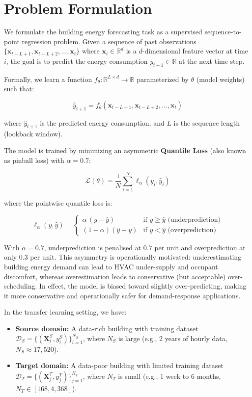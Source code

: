 \documentclass[12pt,a4paper]{report}
\newcommand{\R}{\mathbb{R}}
\begin{document}
\section{Problem Formulation}

We formulate the building energy forecasting task as a supervised sequence-to-point regression problem. Given a sequence of past observations \(\{\mathbf{x}_{t-L+1}, \mathbf{x}_{t-L+2}, \ldots, \mathbf{x}_t\}\) where \(\mathbf{x}_i \in \R^d\) is a \(d\)-dimensional feature vector at time \(i\), the goal is to predict the energy consumption \(y_{t+1} \in \R\) at the next time step.

Formally, we learn a function \(f_{\theta}: \R^{L \times d} \to \R\) parameterized by \(\theta\) (model weights) such that:

\[
\hat{y}_{t+1} = f_{\theta}(\mathbf{x}_{t-L+1}, \mathbf{x}_{t-L+2}, \ldots, \mathbf{x}_t)
\]

where \(\hat{y}_{t+1}\) is the predicted energy consumption, and \(L\) is the sequence length (lookback window).

The model is trained by minimizing an asymmetric \textbf{Quantile Loss} (also known as pinball loss) with \(\alpha = 0.7\):

\[
\mathcal{L}(\theta) = \frac{1}{N} \sum_{i=1}^{N} \ell_\alpha(y_i, \hat{y}_i)
\]

where the pointwise quantile loss is:

\[
\ell_\alpha(y, \hat{y}) =
\begin{cases}
\alpha \,(y - \hat{y}) & \text{if } y \geq \hat{y} \text{ (underprediction)} \\
(1 - \alpha)(\hat{y} - y) & \text{if } y < \hat{y} \text{ (overprediction)}
\end{cases}
\]

With \(\alpha = 0.7\), underprediction is penalised at \(0.7\) per unit and overprediction at only \(0.3\) per unit. This asymmetry is operationally motivated: underestimating building energy demand can lead to HVAC under-supply and occupant discomfort, whereas overestimation leads to conservative (but acceptable) over-scheduling. In effect, the model is biased toward slightly over-predicting, making it more conservative and operationally safer for demand-response applications.

In the transfer learning setting, we have:

\begin{itemize}
    \item \textbf{Source domain:} A data-rich building with training dataset \(\mathcal{D}_S = \{(\mathbf{X}_i^S, y_i^S)\}_{i=1}^{N_S}\), where \(N_S\) is large (e.g., 2 years of hourly data, \(N_S \approx 17,520\)).
    \item \textbf{Target domain:} A data-poor building with limited training dataset \(\mathcal{D}_T = \{(\mathbf{X}_j^T, y_j^T)\}_{j=1}^{N_T}\), where \(N_T\) is small (e.g., 1 week to 6 months, \(N_T \in [168, 4,368]\)).
\end{itemize}
\end{document}
